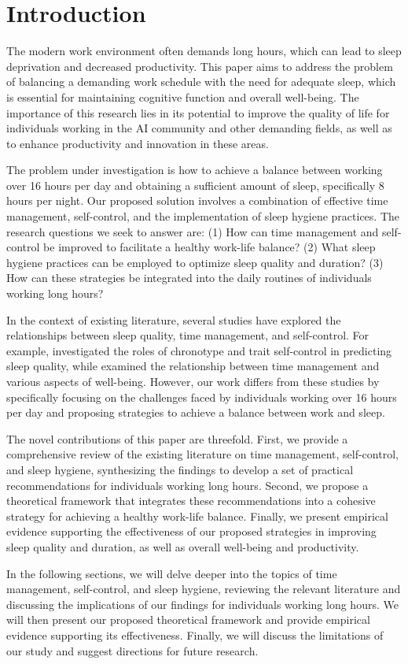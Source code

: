 \section{Introduction}

The modern work environment often demands long hours, which can lead to sleep deprivation and decreased productivity. This paper aims to address the problem of balancing a demanding work schedule with the need for adequate sleep, which is essential for maintaining cognitive function and overall well-being. The importance of this research lies in its potential to improve the quality of life for individuals working in the AI community and other demanding fields, as well as to enhance productivity and innovation in these areas.

The problem under investigation is how to achieve a balance between working over 16 hours per day and obtaining a sufficient amount of sleep, specifically 8 hours per night. Our proposed solution involves a combination of effective time management, self-control, and the implementation of sleep hygiene practices. The research questions we seek to answer are: (1) How can time management and self-control be improved to facilitate a healthy work-life balance? (2) What sleep hygiene practices can be employed to optimize sleep quality and duration? (3) How can these strategies be integrated into the daily routines of individuals working long hours?

In the context of existing literature, several studies have explored the relationships between sleep quality, time management, and self-control. For example, \citet{lin2022chronotype} investigated the roles of chronotype and trait self-control in predicting sleep quality, while \citet{aeon2021does} examined the relationship between time management and various aspects of well-being. However, our work differs from these studies by specifically focusing on the challenges faced by individuals working over 16 hours per day and proposing strategies to achieve a balance between work and sleep.

The novel contributions of this paper are threefold. First, we provide a comprehensive review of the existing literature on time management, self-control, and sleep hygiene, synthesizing the findings to develop a set of practical recommendations for individuals working long hours. Second, we propose a theoretical framework that integrates these recommendations into a cohesive strategy for achieving a healthy work-life balance. Finally, we present empirical evidence supporting the effectiveness of our proposed strategies in improving sleep quality and duration, as well as overall well-being and productivity.

In the following sections, we will delve deeper into the topics of time management, self-control, and sleep hygiene, reviewing the relevant literature and discussing the implications of our findings for individuals working long hours. We will then present our proposed theoretical framework and provide empirical evidence supporting its effectiveness. Finally, we will discuss the limitations of our study and suggest directions for future research.